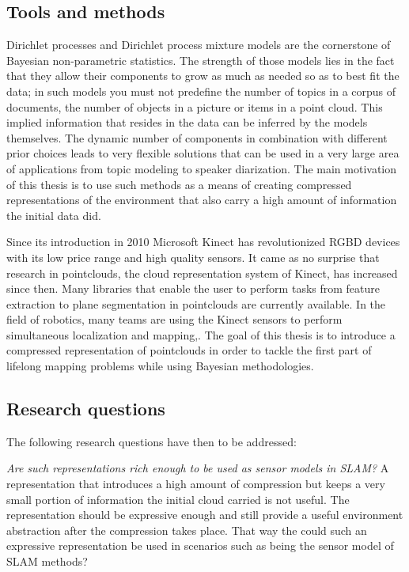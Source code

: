 \documentclass [twoside,hidelinks]{article}
\begin{document}
\subsection{Tools and methods}
Dirichlet processes and Dirichlet process mixture models \cite{nonParam} are the cornerstone of Bayesian non-parametric statistics. The strength of those models lies in the fact that they allow their components to grow as much as needed so as to best fit the data; in such models you must not predefine the number of topics in a corpus of documents, the number of objects in a picture or items in a point cloud. This implied information that resides in the data can be inferred by the models themselves. The dynamic number of components in combination with different prior choices leads to very flexible solutions that can be used in a very large area of applications from topic modeling\cite{LDA} to speaker diarization\cite{speakerDiar}.
The main motivation of this thesis is to use such methods as a means of creating compressed representations of the environment that also carry a high amount of information the initial data did. 

Since its introduction in 2010 Microsoft Kinect\cite{kinect} has revolutionized RGBD devices with its low price range and high quality sensors. It came as no surprise that research in pointclouds, the cloud representation system of Kinect, has increased since then. Many libraries that enable the user to perform tasks from feature extraction to plane segmentation\cite{pcl} in pointclouds are currently available. In the field of robotics, many teams are using the Kinect sensors to perform simultaneous localization and mapping\cite{rtabmap},\cite{rgbdmapping}. The goal of this thesis is to introduce a compressed representation of pointclouds in order to tackle the first part of lifelong mapping problems while using Bayesian methodologies. 


\subsection{Research questions}


The following research questions have then to be addressed: 

\textit{Are such representations rich enough to be used as sensor models in SLAM?}
A representation that introduces a high amount of compression but keeps a very small portion of information the initial cloud carried is not useful. The representation should be expressive enough and still provide a useful environment abstraction after the compression takes place. That way the could such an expressive representation be used in scenarios such as being the sensor model of SLAM methods?
\end{document}
